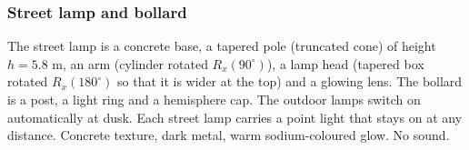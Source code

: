 \subsubsection{Street lamp and bollard}

 The street lamp is a concrete base, a tapered pole (truncated cone) of height
$h=5.8$ m, an arm (cylinder rotated $R_x(90^\circ)$), a lamp head (tapered box rotated $R_x(180^\circ)$ so that it
is wider at the top) and a glowing lens. The bollard is a post, a light ring and a hemisphere cap.
 The outdoor lamps switch on automatically at dusk. Each street lamp carries a point light that stays
on at any distance.
 Concrete texture, dark metal, warm sodium-coloured glow. No sound.

